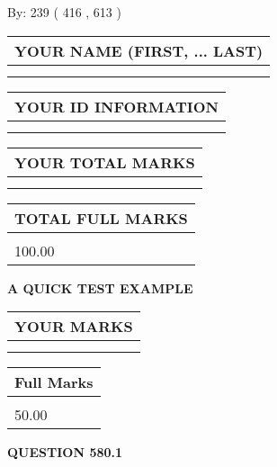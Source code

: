 \documentclass[12pt]{article}
\begin{document}
   
\hspace{1.0in} By: 
 239 ( 416 ,  613 )
   
   
   
   
\newpage 
\setcounter{page}{ 
   580001 } 
   
   
   
   
\noindent\begin{tabular}{|l|}
\hline
YOUR NAME (FIRST, ... LAST)  \\
\hline
 \\ 
 \\ 
\hline
\end{tabular}
\hspace{0.05in} \begin{tabular}{|l|}
\hline
 YOUR   ID   INFORMATION  \\
\hline
 \\ 
 \\ 
\hline
\end{tabular}
   
   
\vspace{0.2in}\noindent\begin{tabular}{|l|}
\hline
YOUR TOTAL MARKS  \\
\hline
 \\ 
 \\ 
\hline
\end{tabular}
\hspace{0.05in} \begin{tabular}{|l|}
\hline
TOTAL FULL MARKS  \\
\hline
 \\ 
100.00 \\
\hline
\end{tabular}
   
   
 \vspace{0.2in}
{\LARGE {\textbf{ A QUICK TEST EXAMPLE}}}
   
   
  
\vspace{0.2in}
  
\noindent\begin{tabular}{|l|}
\hline
 YOUR MARKS  \\
\hline
 \\ 
 \\ 
\hline
\end{tabular}
\hspace{0.05in} \begin{tabular}{|l|}
\hline
 Full Marks  \\
\hline
 \\ 
50.00 \\
\hline
\end{tabular}
{\textbf{\Large{QUESTION
580.1 
}}}
  
\end{document}
